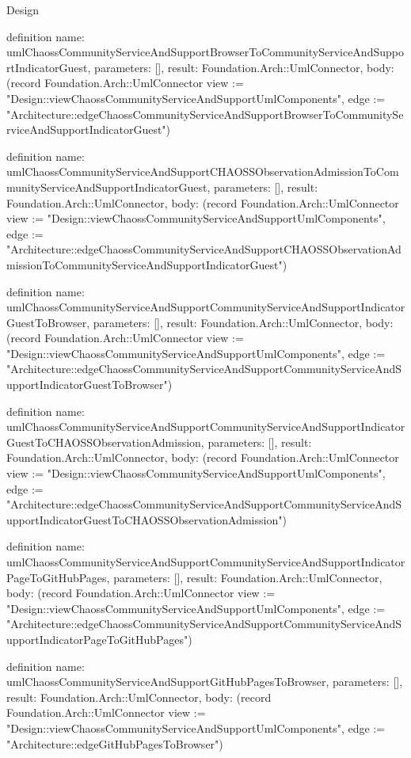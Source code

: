 \begin{lexlean}{Design}
\begin{semanticmodule}
definition{
  name: umlChaossCommunityServiceAndSupportBrowserToCommunityServiceAndSupportIndicatorGuest,
  parameters: [],
  result: Foundation.Arch::UmlConnector,
  body: (record Foundation.Arch::UmlConnector {view := "Design::viewChaossCommunityServiceAndSupportUmlComponents", edge := "Architecture::edgeChaossCommunityServiceAndSupportBrowserToCommunityServiceAndSupportIndicatorGuest"})
}

definition{
  name: umlChaossCommunityServiceAndSupportCHAOSSObservationAdmissionToCommunityServiceAndSupportIndicatorGuest,
  parameters: [],
  result: Foundation.Arch::UmlConnector,
  body: (record Foundation.Arch::UmlConnector {view := "Design::viewChaossCommunityServiceAndSupportUmlComponents", edge := "Architecture::edgeChaossCommunityServiceAndSupportCHAOSSObservationAdmissionToCommunityServiceAndSupportIndicatorGuest"})
}

definition{
  name: umlChaossCommunityServiceAndSupportCommunityServiceAndSupportIndicatorGuestToBrowser,
  parameters: [],
  result: Foundation.Arch::UmlConnector,
  body: (record Foundation.Arch::UmlConnector {view := "Design::viewChaossCommunityServiceAndSupportUmlComponents", edge := "Architecture::edgeChaossCommunityServiceAndSupportCommunityServiceAndSupportIndicatorGuestToBrowser"})
}

definition{
  name: umlChaossCommunityServiceAndSupportCommunityServiceAndSupportIndicatorGuestToCHAOSSObservationAdmission,
  parameters: [],
  result: Foundation.Arch::UmlConnector,
  body: (record Foundation.Arch::UmlConnector {view := "Design::viewChaossCommunityServiceAndSupportUmlComponents", edge := "Architecture::edgeChaossCommunityServiceAndSupportCommunityServiceAndSupportIndicatorGuestToCHAOSSObservationAdmission"})
}

definition{
  name: umlChaossCommunityServiceAndSupportCommunityServiceAndSupportIndicatorPageToGitHubPages,
  parameters: [],
  result: Foundation.Arch::UmlConnector,
  body: (record Foundation.Arch::UmlConnector {view := "Design::viewChaossCommunityServiceAndSupportUmlComponents", edge := "Architecture::edgeChaossCommunityServiceAndSupportCommunityServiceAndSupportIndicatorPageToGitHubPages"})
}

definition{
  name: umlChaossCommunityServiceAndSupportGitHubPagesToBrowser,
  parameters: [],
  result: Foundation.Arch::UmlConnector,
  body: (record Foundation.Arch::UmlConnector {view := "Design::viewChaossCommunityServiceAndSupportUmlComponents", edge := "Architecture::edgeGitHubPagesToBrowser"})
}


\end{semanticmodule}
\end{lexlean}

